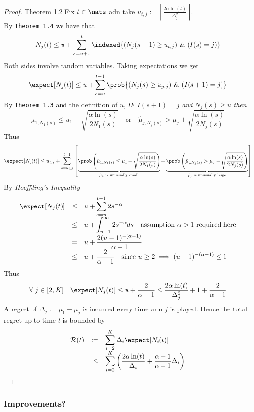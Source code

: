 \documentclass[11pt,a4paper]{article}
\begin{document}
  \begin{proof}{Theorem 1.2}
    Fix $t\in\nats$ adn take $u_{t,j}:=\left\lceil\frac{2\alpha\ln(t)}{\Delta_j^2}\right\rceil$.\\
    By \texttt{Theorem 1.4} we have that
    \[ N_j(t)\leq u+\sum_{s=u+1}^t\indexed\{(N_j(s-1)\geq u_{t,j})\ \&\ (I(s)=j)\} \]
    Both sides involve random variables. Taking expectations we get
    \[ \expect[N_j(t)]\leq u+\sum_{s=u}^{t-1}\prob\big\{(N_j(s)\geq u_{y,j})\ \&\ (I(s+1)=j)\big\} \]
    By \texttt{Theorem 1.3} and the definition of $u$, \textit{IF} $I(s+1)=j$\textit{ and }$N_j(s)\geq u$\textit{ then}
    \[ \hat\mu_{1,N_1(s)}\leq u_1-\sqrt{\frac{\alpha\ln(s)}{2N_1(s)}}\quad\text{or}\quad\hat\mu_{j,N_j(s)}>\mu_j+\sqrt{\frac{\alpha\ln(s)}{2N_j(s)}} \]
    Thus
    \[ \expect[N_j(t)]\leq u_{t,j}+\sum_{s=u_{t,j}}^{t-1}\left[\underbrace{\prob\left(\hat\mu_{1,N_1(s)}\leq\mu_1-\sqrt{\frac{\alpha\ln(s)}{2N_1(s)}}\right)}_{\tiny\text{$\hat\mu_1$ is unusually small}}+\underbrace{\prob\left(\hat\mu_{j,N_j(s)}>\mu_j-\sqrt{\frac{\alpha\ln(s)}{2N_j(s)}}\right)}_{\tiny\text{$\hat\mu_j$ is unusually large}}\right] \]
    By \textit{Hoeffding's Inequality}
    \[\begin{array}{rcl}
    \expect[N_j(t)]&\leq&\displaystyle u+\sum_{s=u}^{t-1}2s^{-\alpha}\\
    &\leq&u+\displaystyle\int_{u-1}^\infty2s^{-\alpha}ds\quad\text{assumption $\alpha>1$ required here}\\
    &=&u+\displaystyle\frac{2(u-1)^{-(\alpha-1)}}{\alpha-1}\\
    &\leq&\displaystyle u+\frac{2}{\alpha-1}\quad\text{since }u\geq2\implies (u-1)^{-(\alpha-1)}\leq 1
    \end{array}\]
    Thus
    \[ \forall\ j\in[2,K]\quad\expect[N_j(t)]\leq u+\frac2{\alpha-1}\leq\frac{2\alpha\ln(t)}{\Delta^2_j}+1+\frac2{\alpha-1} \]
    A regret of $\Delta_j:=\mu_1-\mu_j$ is incurred every time arm $j$ is played. Hence the total regret up to time $t$ is bounded by
    \[\begin{array}{rrl}
      \mathcal{R}(t)&:=&\displaystyle\sum_{i=2}^K\Delta_i\expect[N_i(t)]\\
      &\leq&\displaystyle\sum_{i=2}^K\left(\frac{2\alpha\ln(t)}{\Delta_i}+\frac{\alpha+1}{\alpha-1}\Delta_i\right)
    \end{array}\]
    \proved
  \end{proof}

\subsubsection{Improvements?}
\end{document}
